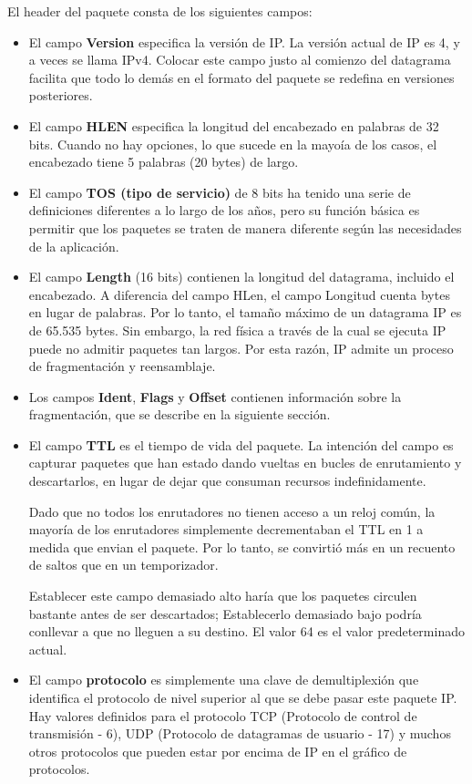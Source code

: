 El header del paquete consta de los siguientes campos:
\begin{itemize}
  \item El campo \textbf{Version} especifica la versión de IP. La versión actual de IP es 4, y a veces se llama IPv4. Colocar este campo justo al comienzo del datagrama facilita que todo lo demás en el formato del paquete se redefina en versiones posteriores.
  \item El campo \textbf{HLEN} especifica la longitud del encabezado en palabras de 32 bits. Cuando no hay opciones, lo que sucede en la mayoía de los casos, el encabezado tiene 5 palabras (20 bytes) de largo.
  \item El campo \textbf{TOS (tipo de servicio)} de 8 bits ha tenido una serie de definiciones diferentes a lo largo de los años, pero su función básica es permitir que los paquetes se traten de manera diferente según las necesidades de la aplicación.
  \item El campo \textbf{Length} (16 bits) contienen la longitud del datagrama, incluido el encabezado. A diferencia del campo HLen, el campo Longitud cuenta bytes en lugar de palabras. Por lo tanto, el tamaño máximo de un datagrama IP es de 65.535 bytes. Sin embargo, la red física a través de la cual se ejecuta IP puede no admitir paquetes tan largos. Por esta razón, IP admite un proceso de fragmentación y reensamblaje.
  \item Los campos \textbf{Ident}, \textbf{Flags} y \textbf{Offset} contienen información sobre la fragmentación, que se describe en la siguiente sección.
  \item El campo \textbf{TTL} es el tiempo de vida del paquete. La intención del campo es capturar paquetes que han estado dando vueltas en bucles de enrutamiento y descartarlos, en lugar de dejar que consuman recursos indefinidamente.

  Dado que no todos los enrutadores no tienen acceso a un reloj común, la mayoría de los enrutadores simplemente decrementaban el TTL en 1 a medida que envian el paquete. Por lo tanto, se convirtió más en un recuento de saltos que en un temporizador.

  Establecer este campo demasiado alto haría que los paquetes circulen bastante antes de ser descartados; Establecerlo demasiado bajo podría conllevar a que no lleguen a su destino. El valor 64 es el valor predeterminado actual.

  \item El campo \textbf{protocolo} es simplemente una clave de demultiplexión que identifica el protocolo de nivel superior al que se debe pasar este paquete IP. Hay valores definidos para el protocolo TCP (Protocolo de control de transmisión - 6), UDP (Protocolo de datagramas de usuario - 17) y muchos otros protocolos que pueden estar por encima de IP en el gráfico de protocolos.
  

\end{itemize}
